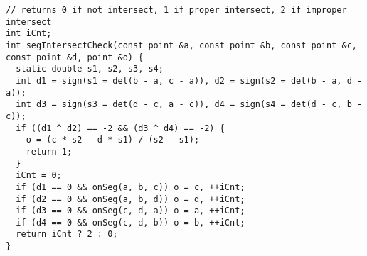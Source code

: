 \begin{lstlisting}
// returns 0 if not intersect, 1 if proper intersect, 2 if improper intersect
int iCnt;
int segIntersectCheck(const point &a, const point &b, const point &c, const point &d, point &o) {
  static double s1, s2, s3, s4;
  int d1 = sign(s1 = det(b - a, c - a)), d2 = sign(s2 = det(b - a, d - a));
  int d3 = sign(s3 = det(d - c, a - c)), d4 = sign(s4 = det(d - c, b - c));
  if ((d1 ^ d2) == -2 && (d3 ^ d4) == -2) {
    o = (c * s2 - d * s1) / (s2 - s1);
    return 1;
  }
  iCnt = 0;
  if (d1 == 0 && onSeg(a, b, c)) o = c, ++iCnt;
  if (d2 == 0 && onSeg(a, b, d)) o = d, ++iCnt;
  if (d3 == 0 && onSeg(c, d, a)) o = a, ++iCnt;
  if (d4 == 0 && onSeg(c, d, b)) o = b, ++iCnt;
  return iCnt ? 2 : 0;
}

\end{lstlisting}